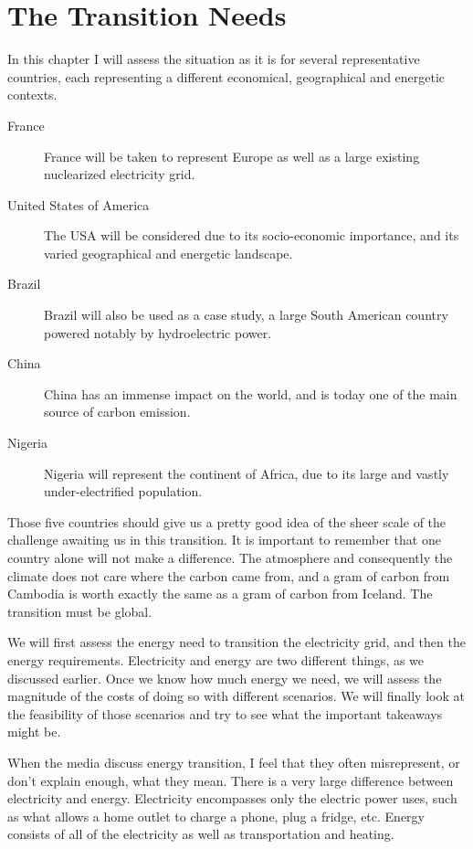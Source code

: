 \setchapterpreamble[u]{\margintoc}
\chapter{The Transition Needs}

In this chapter I will assess the situation as it is for several representative countries, each representing a different economical, geographical and energetic contexts.

\begin{description}
	\item[France] France will be taken to represent Europe as well as a large existing nuclearized electricity grid.
	\item[United States of America] The USA will be considered due to its socio-economic importance, and its varied geographical and energetic landscape.
	\item[Brazil] Brazil will also be used as a case study, a large South American country powered notably by hydroelectric power.
	\item[China] China has an immense impact on the world, and is today one of the main source of carbon emission.
	\item[Nigeria] Nigeria will represent the continent of Africa, due to its large and vastly under-electrified population.
\end{description}

Those five countries should give us a pretty good idea of the sheer scale of the challenge awaiting us in this transition. It is important to remember that one country alone will not make a difference. The atmosphere and consequently the climate does not care where the carbon came from, and a gram of carbon from Cambodia is worth exactly the same as a gram of carbon from Iceland. The transition must be global.

We will first assess the energy need to transition the electricity grid, and then the energy requirements. Electricity and energy are two different things, as we discussed earlier. Once we know how much energy we need, we will assess the magnitude of the costs of doing so with different scenarios. We will finally look at the feasibility of those scenarios and try to see what the important takeaways might be.


When the media discuss energy transition, I feel that they often misrepresent, or don't explain enough, what they mean. There is a very large difference between electricity and energy. Electricity encompasses only the electric power uses, such as what allows a home outlet to charge a phone, plug a fridge, etc. Energy consists of all of the electricity as well as transportation and heating.

